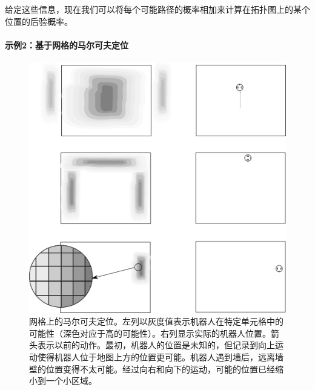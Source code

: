 给定这些信息，现在我们可以将每个可能路径的概率相加来计算在拓扑图上的某个位置的后验概率。

\paragraph{示例2：基于网格的马尔可夫定位}

\begin{figure}
	\centering
		\includegraphics[width=\textwidth]{figs/markov_grid_example}
	\caption{网格上的马尔可夫定位。左列以灰度值表示机器人在特定单元格中的可能性（深色对应于高的可能性）。右列显示实际的机器人位置。箭头表示以前的动作。最初，机器人的位置是未知的，但记录到向上运动使得机器人位于地图上方的位置更可能。机器人遇到墙后，远离墙壁的位置变得不太可能。经过向右和向下的运动，可能的位置已经缩小到一个小区域。}
	\label{fig:markov_grid_example}
\end{figure}

